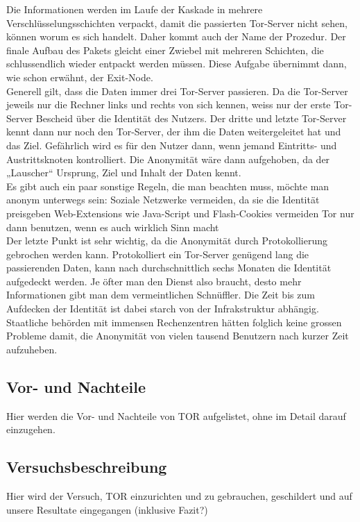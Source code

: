 Die Informationen werden im Laufe der Kaskade in mehrere Verschlüsselungsschichten verpackt, damit die passierten Tor-Server nicht sehen, können worum es sich handelt. Daher kommt auch der Name der Prozedur. Der finale Aufbau des Pakets gleicht einer Zwiebel mit mehreren Schichten, die  schlussendlich wieder entpackt werden müssen. Diese Aufgabe übernimmt dann, wie schon erwähnt, der Exit-Node.
\\
Generell gilt, dass die Daten immer drei Tor-Server passieren. Da die Tor-Server jeweils nur die Rechner links und rechts von sich kennen, weiss nur der erste Tor-Server Bescheid über die Identität des Nutzers. Der dritte und letzte Tor-Server kennt dann nur noch den Tor-Server, der ihm die Daten weitergeleitet hat und das Ziel. Gefährlich wird es für den Nutzer dann, wenn jemand Eintritts- und Austrittsknoten kontrolliert. Die Anonymität wäre dann aufgehoben, da der „Lauscher“ Ursprung, Ziel und Inhalt der Daten kennt.
\\
Es gibt auch ein paar sonstige Regeln, die man beachten muss, möchte man anonym unterwegs sein:
Soziale Netzwerke vermeiden, da sie die Identität preisgeben
Web-Extensions wie Java-Script und Flash-Cookies vermeiden
Tor nur dann benutzen, wenn es auch wirklich Sinn macht
\\
Der letzte Punkt ist sehr wichtig, da die Anonymität durch Protokollierung gebrochen werden kann. Protokolliert ein Tor-Server genügend lang die passierenden Daten, kann nach durchschnittlich sechs Monaten die Identität aufgedeckt werden. Je öfter man den Dienst also braucht, desto mehr Informationen gibt man dem vermeintlichen Schnüffler. Die Zeit bis zum Aufdecken der Identität ist dabei starch von der Infrakstruktur abhängig. Staatliche behörden mit immensen Rechenzentren hätten folglich keine grossen Probleme damit, die Anonymität von vielen tausend Benutzern nach kurzer Zeit aufzuheben.

\subsection{Vor- und Nachteile}
Hier werden die Vor- und Nachteile von TOR aufgelistet, ohne im Detail darauf einzugehen.

\subsection{Versuchsbeschreibung}
Hier wird der Versuch, TOR einzurichten und zu gebrauchen, geschildert und auf unsere Resultate eingegangen (inklusive Fazit?)

